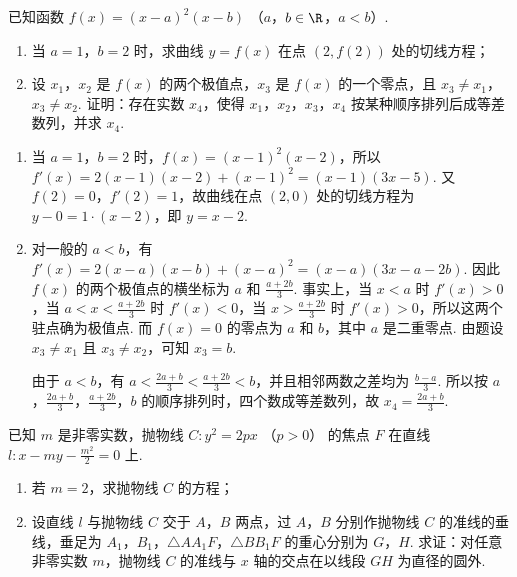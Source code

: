 \begin{problem}
已知函数 \(f(x) = (x - a)^2(x - b)\) （\(a\)，\(b \in \R\)，\(a < b\)）.

\begin{enumerate}
\item 当 \(a = 1\)，\(b = 2\) 时，求曲线 \(y = f(x)\) 在点 \((2, f(2))\) 处的切线方程；
\item 设 \(x_1\)，\(x_2\) 是 \(f(x)\) 的两个极值点，\(x_3\) 是 \(f(x)\) 的一个零点，且 \(x_3 \neq x_1\)，\(x_3 \neq x_2\). 证明：存在实数 \(x_4\)，使得 \(x_1\)，\(x_2\)，\(x_3\)，\(x_4\) 按某种顺序排列后成等差数列，并求 \(x_4\).
\end{enumerate}
\end{problem}

\begin{solution}
\begin{enumerate}
\item 当 \(a=1\)，\(b=2\) 时，\(f(x)=(x-1)^2(x-2)\)，所以
\(f'(x)=2(x-1)(x-2)+(x-1)^2=(x-1)(3x-5)\). 又 \(f(2)=0\)，\(f'(2)=1\)，故曲线在点 \((2,0)\) 处的切线方程为 \(y-0=1\cdot(x-2)\)，即 \(y=x-2\).
\item 对一般的 \(a<b\)，有
\(f'(x)=2(x-a)(x-b)+(x-a)^2=(x-a)(3x-a-2b)\). 因此 \(f(x)\) 的两个极值点的横坐标为
\(a\) 和 \(\frac{a+2b}{3}\). 事实上，当 \(x<a\) 时 \(f'(x)>0\)，当
\(a<x<\frac{a+2b}{3}\) 时 \(f'(x)<0\)，当 \(x>\frac{a+2b}{3}\) 时
\(f'(x)>0\)，所以这两个驻点确为极值点. 而 \(f(x)=0\) 的零点为 \(a\) 和
\(b\)，其中 \(a\) 是二重零点. 由题设 \(x_3\neq x_1\) 且 \(x_3\neq x_2\)，可知
\(x_3=b\).

由于 \(a<b\)，有
\(a<\frac{2a+b}{3}<\frac{a+2b}{3}<b\)，并且相邻两数之差均为 \(\frac{b-a}{3}\). 所以按 \(a\)，\(\frac{2a+b}{3}\)，\(\frac{a+2b}{3}\)，\(b\) 的顺序排列时，四个数成等差数列，故 \(x_4=\frac{2a+b}{3}\).
\end{enumerate}
\end{solution}

\begin{problem}
已知 \(m\) 是非零实数，抛物线 \(C: y^{2} = 2px\) （\(p > 0\)） 的焦点 \(F\) 在直线 \(l: x - my - \frac{m^{2}}{2} = 0\) 上.

\begin{enumerate}
\item 若 \(m = 2\)，求抛物线 \(C\) 的方程；
\item 设直线 \(l\) 与抛物线 \(C\) 交于 \(A\)，\(B\) 两点，过 \(A\)，\(B\) 分别作抛物线 \(C\) 的准线的垂线，垂足为 \(A_{1}\)，\(B_{1}\)，\(\triangle AA_{1}F\)，\(\triangle BB_{1}F\) 的重心分别为 \(G\)，\(H\). 求证：对任意非零实数 \(m\)，抛物线 \(C\) 的准线与 \(x\) 轴的交点在以线段 \(GH\) 为直径的圆外.
\end{enumerate}

\end{problem}

